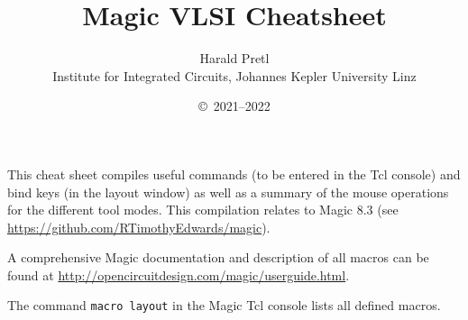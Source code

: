 \documentclass[10pt,a4paper]{article}
\author{Harald Pretl\\Institute for Integrated Circuits, Johannes Kepler University Linz}
\title{Magic VLSI Cheatsheet}
\date{\copyright~2021--2022}
\begin{document}
	\maketitle
	
	This cheat sheet compiles useful commands (to be entered in the Tcl console) and bind keys (in the layout window) as well as a summary of the mouse operations for the different tool modes. This compilation relates to Magic 8.3 (see \url{https://github.com/RTimothyEdwards/magic}).
	
	A comprehensive Magic documentation and description of all macros can be found at \url{http://opencircuitdesign.com/magic/userguide.html}.
	
	The command \texttt{macro layout} in the Magic Tcl console lists all defined macros.
	
	\newpage
\end{document}
